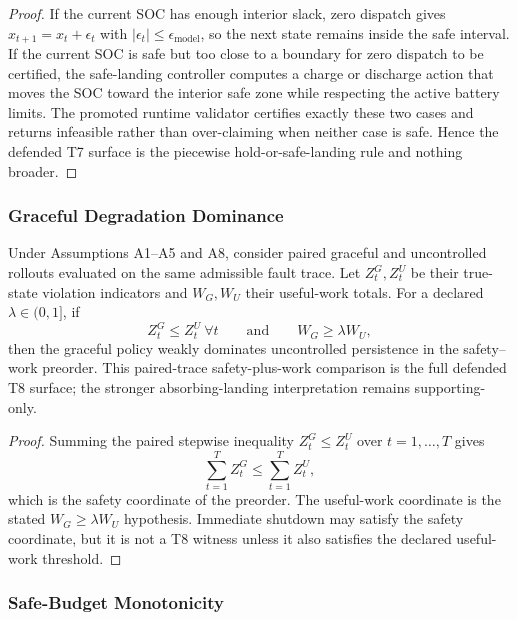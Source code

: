 \begin{proof}
If the current SOC has enough interior slack, zero dispatch gives
$x_{t+1}=x_t+\epsilon_t$ with $|\epsilon_t|\le\epsilon_{\text{model}}$, so the
next state remains inside the safe interval.  If the current SOC is safe but
too close to a boundary for zero dispatch to be certified, the safe-landing
controller computes a charge or discharge action that moves the SOC toward the
interior safe zone while respecting the active battery limits.  The promoted
runtime validator certifies exactly these two cases and returns infeasible
rather than over-claiming when neither case is safe.  Hence the defended T7
surface is the piecewise hold-or-safe-landing rule and nothing broader.
\end{proof}

\subsubsection{Graceful Degradation Dominance}

\begin{theorem}
\label{thm:graceful-dominance}
Under Assumptions A1--A5 and A8, consider paired graceful and uncontrolled
rollouts evaluated on the same admissible fault trace.  Let \(Z_t^G,Z_t^U\) be
their true-state violation indicators and \(W_G,W_U\) their useful-work totals.
For a declared \(\lambda\in(0,1]\), if
\[
  Z_t^G\le Z_t^U\ \forall t
  \qquad\text{and}\qquad
  W_G\ge\lambda W_U,
\]
then the graceful policy weakly dominates uncontrolled persistence in the
safety--work preorder.  This paired-trace safety-plus-work comparison is the
full defended T8 surface; the stronger absorbing-landing interpretation remains
supporting-only.
\end{theorem}

\begin{proof}
Summing the paired stepwise inequality \(Z_t^G\le Z_t^U\) over
\(t=1,\dots,T\) gives
\[
  \sum_{t=1}^{T} Z_t^G
  \le
  \sum_{t=1}^{T} Z_t^U,
\]
which is the safety coordinate of the preorder.  The useful-work coordinate is
the stated \(W_G\ge\lambda W_U\) hypothesis.  Immediate shutdown may satisfy
the safety coordinate, but it is not a T8 witness unless it also satisfies the
declared useful-work threshold.
\end{proof}

\subsubsection{Safe-Budget Monotonicity}

